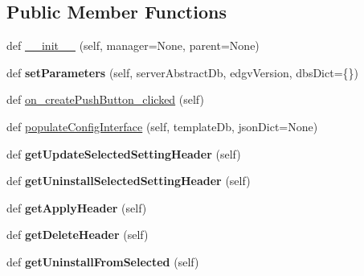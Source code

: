 \subsection*{Public Member Functions}
\begin{DoxyCompactItemize}
\item 
def \mbox{\hyperlink{class_dsg_tools_1_1_custom_widgets_1_1style_manager_widget_1_1_style_manager_widget_a168b10e4d1715aea78786c6a7393824e}{\+\_\+\+\_\+init\+\_\+\+\_\+}} (self, manager=None, parent=None)
\item 
\mbox{\label{class_dsg_tools_1_1_custom_widgets_1_1style_manager_widget_1_1_style_manager_widget_a91887b0541eb299ad5f27ecf2ecf4ff2}} 
def {\bfseries set\+Parameters} (self, server\+Abstract\+Db, edgv\+Version, dbs\+Dict=\{\})
\item 
def \mbox{\hyperlink{class_dsg_tools_1_1_custom_widgets_1_1style_manager_widget_1_1_style_manager_widget_a46d0278c7e2d92c0f0c1caba83645fe9}{on\+\_\+create\+Push\+Button\+\_\+clicked}} (self)
\item 
def \mbox{\hyperlink{class_dsg_tools_1_1_custom_widgets_1_1style_manager_widget_1_1_style_manager_widget_a7ce683581aa995c7c04fc05fbd277c1b}{populate\+Config\+Interface}} (self, template\+Db, json\+Dict=None)
\item 
\mbox{\label{class_dsg_tools_1_1_custom_widgets_1_1style_manager_widget_1_1_style_manager_widget_ac29b9435ebce02ec326195bb3c3717a3}} 
def {\bfseries get\+Update\+Selected\+Setting\+Header} (self)
\item 
\mbox{\label{class_dsg_tools_1_1_custom_widgets_1_1style_manager_widget_1_1_style_manager_widget_ad297cabb1c63c69c9c9ecc3bd0bd8d84}} 
def {\bfseries get\+Uninstall\+Selected\+Setting\+Header} (self)
\item 
\mbox{\label{class_dsg_tools_1_1_custom_widgets_1_1style_manager_widget_1_1_style_manager_widget_a881c63707fc3b82c0d4255a35aa43367}} 
def {\bfseries get\+Apply\+Header} (self)
\item 
\mbox{\label{class_dsg_tools_1_1_custom_widgets_1_1style_manager_widget_1_1_style_manager_widget_ab90115486c2c955540caba3b24324112}} 
def {\bfseries get\+Delete\+Header} (self)
\item 
\mbox{\label{class_dsg_tools_1_1_custom_widgets_1_1style_manager_widget_1_1_style_manager_widget_a3d19c26d22e5a5ade5d3ecd1efb6115f}} 
def {\bfseries get\+Uninstall\+From\+Selected} (self)
\end{DoxyCompactItemize}
